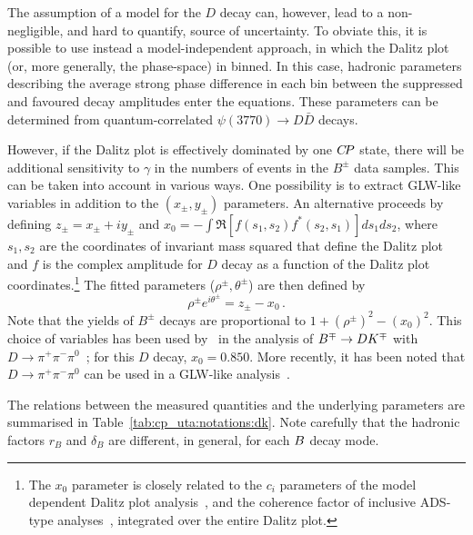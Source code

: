 The assumption of a model for the $D$ decay can, however, lead to a non-negligible, and hard to quantify, source of uncertainty.
To obviate this, it is possible to use instead a model-independent approach, in which the Dalitz plot (or, more generally, the phase-space) in binned.
In this case, hadronic parameters describing the average strong phase difference in each bin between the suppressed and favoured decay amplitudes enter the equations.
These parameters can be determined from quantum-correlated $\psi(3770) \to D\bar{D}$ decays.

However, if the Dalitz plot is effectively dominated by one $C\!P$ state,
there will be additional sensitivity to $\gamma$ in the numbers of events
in the $B^\pm$ data samples.
This can be taken into account in various ways.
One possibility is to extract GLW-like variables 
in addition to the $\left( x_\pm, y_\pm \right)$ parameters.
An alternative proceeds by defining $z_\pm = x_\pm + i y_\pm$
and $x_0 = - \int \Re \left[ f(s_1,s_2)f^*(s_2,s_1) \right] ds_1ds_2$,
where $s_1, s_2$ are the coordinates of invariant mass squared that
define the Dalitz plot and $f$ is the complex amplitude for $D$ decay
as a function of the Dalitz plot coordinates.\footnote{
  The $x_0$ parameter is closely related to the $c_i$ parameters of 
  the model dependent Dalitz plot analysis~\cite{Giri:2003ty,Bondar:2005ki,Bondar:2008hh},
  and the coherence factor of inclusive ADS-type analyses~\cite{Atwood:2003mj},
  integrated over the entire Dalitz plot.
}
The fitted parameters ($\rho^\pm, \theta^\pm$) are then defined by
\begin{equation}
  \rho^\pm e^{i \theta^\pm} = z_\pm - x_0 \, .
\end{equation}
Note that the yields of $B^\pm$ decays are proportional 
to $1 + (\rho^\pm)^2 - (x_0)^2$. 
This choice of variables has been used by \babar\ in the analysis of
$B^\mp \to DK^\mp$ with $D \to \pi^+\pi^-\pi^0$~\cite{Aubert:2007ii};
for this $D$ decay, $x_0 = 0.850$.
More recently, it has been noted that $D \to \pi^+\pi^-\pi^0$ can be used in a
GLW-like analysis~\cite{Nayak:2014tea}.

The relations between the measured quantities and the
underlying parameters are summarised in Table~\ref{tab:cp_uta:notations:dk}.
Note carefully that the hadronic factors $r_B$ and $\delta_B$ 
are different, in general, for each $B$ decay mode.

